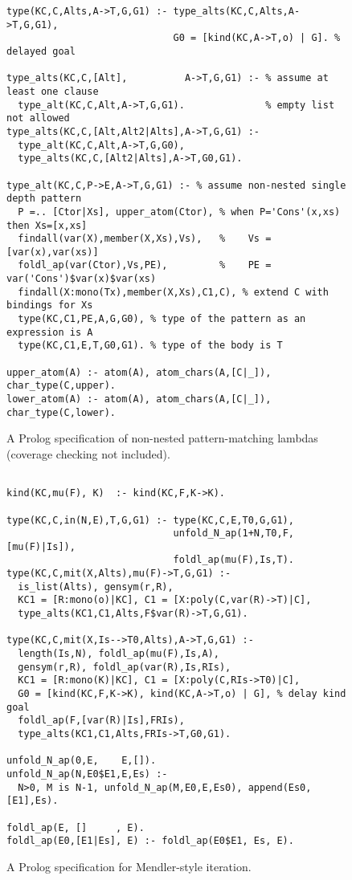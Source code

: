 \documentclass[runningheads,a4paper]{llncs}
\begin{document}
\begin{figure}
\begin{verbatim}
type(KC,C,Alts,A->T,G,G1) :- type_alts(KC,C,Alts,A->T,G,G1),
                             G0 = [kind(KC,A->T,o) | G]. % delayed goal

type_alts(KC,C,[Alt],          A->T,G,G1) :- % assume at least one clause
  type_alt(KC,C,Alt,A->T,G,G1).              % empty list not allowed
type_alts(KC,C,[Alt,Alt2|Alts],A->T,G,G1) :-
  type_alt(KC,C,Alt,A->T,G,G0),
  type_alts(KC,C,[Alt2|Alts],A->T,G0,G1).

type_alt(KC,C,P->E,A->T,G,G1) :- % assume non-nested single depth pattern
  P =.. [Ctor|Xs], upper_atom(Ctor), % when P='Cons'(x,xs) then Xs=[x,xs]
  findall(var(X),member(X,Xs),Vs),   %    Vs = [var(x),var(xs)]  
  foldl_ap(var(Ctor),Vs,PE),         %    PE = var('Cons')$var(x)$var(xs)
  findall(X:mono(Tx),member(X,Xs),C1,C), % extend C with bindings for Xs
  type(KC,C1,PE,A,G,G0), % type of the pattern as an expression is A
  type(KC,C1,E,T,G0,G1). % type of the body is T

upper_atom(A) :- atom(A), atom_chars(A,[C|_]), char_type(C,upper).
lower_atom(A) :- atom(A), atom_chars(A,[C|_]), char_type(C,lower).
\end{verbatim}
\vspace*{-1ex}
\caption{A Prolog specification of non-nested pattern-matching lambdas
$\qquad$ (coverage checking not included).}
\label{fig:patlam}
\end{figure}
\begin{figure}
\begin{verbatim}

kind(KC,mu(F), K)  :- kind(KC,F,K->K).

type(KC,C,in(N,E),T,G,G1) :- type(KC,C,E,T0,G,G1),
                             unfold_N_ap(1+N,T0,F,[mu(F)|Is]),
                             foldl_ap(mu(F),Is,T).
type(KC,C,mit(X,Alts),mu(F)->T,G,G1) :-
  is_list(Alts), gensym(r,R),
  KC1 = [R:mono(o)|KC], C1 = [X:poly(C,var(R)->T)|C],
  type_alts(KC1,C1,Alts,F$var(R)->T,G,G1).

type(KC,C,mit(X,Is-->T0,Alts),A->T,G,G1) :-
  length(Is,N), foldl_ap(mu(F),Is,A),
  gensym(r,R), foldl_ap(var(R),Is,RIs),
  KC1 = [R:mono(K)|KC], C1 = [X:poly(C,RIs->T0)|C],
  G0 = [kind(KC,F,K->K), kind(KC,A->T,o) | G], % delay kind goal
  foldl_ap(F,[var(R)|Is],FRIs),
  type_alts(KC1,C1,Alts,FRIs->T,G0,G1).

unfold_N_ap(0,E,    E,[]).
unfold_N_ap(N,E0$E1,E,Es) :-
  N>0, M is N-1, unfold_N_ap(M,E0,E,Es0), append(Es0,[E1],Es).

foldl_ap(E, []     , E).
foldl_ap(E0,[E1|Es], E) :- foldl_ap(E0$E1, Es, E).
\end{verbatim}
\vspace*{-1ex}
\caption{A Prolog specification for Mendler-style iteration.}
\label{fig:mit}
\end{figure}
\end{document}
